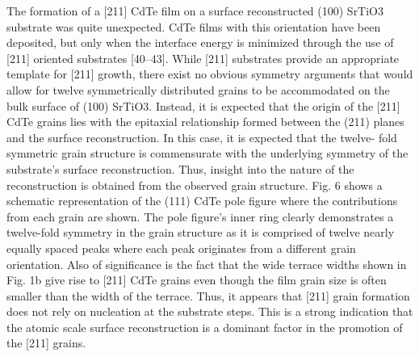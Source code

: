 The formation of a [211] CdTe film on a surface reconstructed
(100) SrTiO3 substrate was quite unexpected. CdTe films with this
orientation have been deposited, but only when the interface
energy is minimized through the use of [211] oriented substrates
[40–43]. While [211] substrates provide an appropriate template
for [211] growth, there exist no obvious symmetry arguments
that would allow for twelve symmetrically distributed grains to be
accommodated on the bulk surface of (100) SrTiO3. Instead, it is
expected that the origin of the [211] CdTe grains lies with the
epitaxial relationship formed between the (211) planes and the
surface reconstruction. In this case, it is expected that the twelve-
fold symmetric grain structure is commensurate with the underlying symmetry of the substrate’s surface reconstruction. Thus,
insight into the nature of the reconstruction is obtained from the
observed grain structure. Fig. 6 shows a schematic representation
of the (111) CdTe pole figure where the contributions from each
grain are shown. The pole figure’s inner ring clearly demonstrates a
twelve-fold symmetry in the grain structure as it is comprised of twelve nearly equally spaced peaks where each peak originates
from a different grain orientation. Also of significance is the fact
that the wide terrace widths shown in Fig. 1b give rise to [211]
CdTe grains even though the film grain size is often smaller than
the width of the terrace. Thus, it appears that [211] grain
formation does not rely on nucleation at the substrate steps. This is
a strong indication that the atomic scale surface reconstruction is a
dominant factor in the promotion of the [211] grains.

